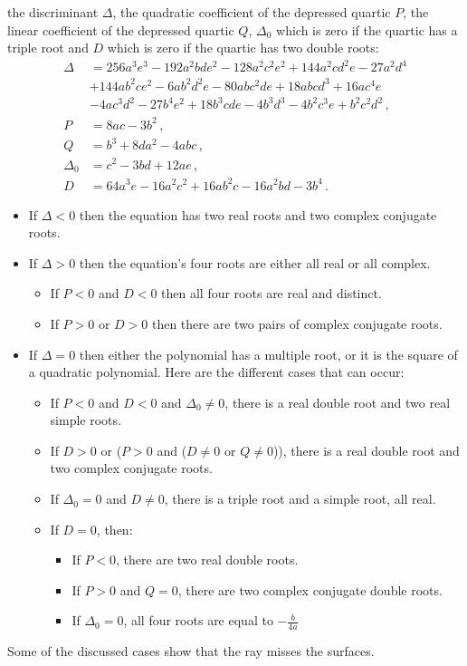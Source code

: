 \documentclass[12pt,a4paper,twoside,openright,BCOR10mm,headsepline,titlepage,abstracton,chapterprefix,final]{scrreprt}
\begin{document}
the discriminant $\Delta$, the quadratic coefficient of the depressed quartic $P$, the linear coefficient of
the depressed quartic $Q$, $\Delta_0$ which is zero if the quartic has a triple root and $D$ which is zero
if the quartic has two double roots:
\begin{subequations}
 \begin{align}
  \Delta &= 256 a^3 e^3 - 192 a^2 b d e^2 - 128 a^2 c^2 e^2 + 144 a^2 c d^2 e - 27 a^2 d^4 \nonumber\\ 
&+ 144 a b^2 c e^2 - 6 a b^2 d^2 e - 80 a b c^2 d e + 18 a b c d^3 + 16 a c^4 e \nonumber\\
&- 4 a c^3 d^2 - 27 b^4 e^2 + 18 b^3 c d e - 4 b^3 d^3 - 4 b^2 c^3 e + b^2 c^2 d^2\,,\\
   P &= 8ac - 3b^2\,,\\
   Q &= b^3+8da^2-4abc\,,\\
   \Delta_0 &= c^2 - 3bd + 12ae\,,\\
   D &= 64 a^3 e - 16 a^2 c^2 + 16 a b^2 c - 16 a^2 bd - 3 b^4\,.
 \end{align}
\end{subequations}

\begin{itemize}
\item If $\Delta < 0$  then the equation has two real roots and two complex conjugate roots.
\item If $\Delta > 0$  then the equation's four roots are either all real or all complex.
\begin{itemize}
\item If $P < 0$ and $D < 0$ then all four roots are real and distinct.
\item If $P > 0$ or $D > 0$ then there are two pairs of complex conjugate roots.
\end{itemize}
\item If $\Delta = 0$  then either the polynomial has a multiple root, 
  or it is the square of a quadratic polynomial. Here are the different cases that can occur:
  \begin{itemize}
\item If $P < 0$ and $D < 0$ and $\Delta_0\ne0$, there is a real double root and two real simple roots.
\item If $D > 0$ or ($P > 0$ and ($D \ne 0$ or $Q \ne 0$)), there is a real double root and two complex conjugate roots.
\item If $\Delta_0 = 0$ and $D \ne 0$, there is a triple root and a simple root, all real.
\item If $D = 0$, then:
  \begin{itemize}
\item If $P < 0$, there are two real double roots.
\item If $P > 0$ and $Q = 0$, there are two complex conjugate double roots.
\item If $ \Delta_0  = 0$, all four roots are equal to $-\frac{b}{4a}$
  \end{itemize}
  \end{itemize}
\end{itemize}
Some of the discussed cases show that the ray misses the surfaces.
\end{document}
